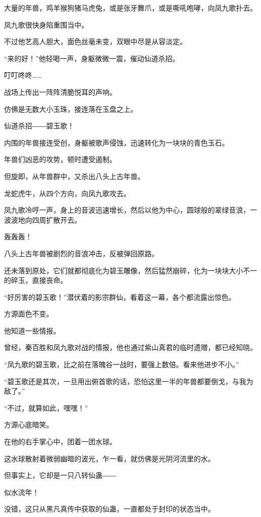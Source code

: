 
\begin{this_body}

大量的年兽，鸡羊猴狗猪马虎兔，或是张牙舞爪，或是嘶吼咆哮，向凤九歌扑去。

凤九歌很快身陷重围当中。

不过他艺高人胆大，面色丝毫未变，双眼中尽是从容淡定。

“来的好！”他轻喝一声，身躯微微一震，催动仙道杀招。

叮叮咚咚……

战场上传出一阵阵清脆悦耳的声响。

仿佛是无数大小玉珠，接连落在玉盘之上。

仙道杀招――碧玉歌！

内围的年兽接连受创，身躯被歌声侵蚀，迅速转化为一块块的青色玉石。

年兽们凶恶的攻势，顿时遭受遏制。

但旋即，从年兽群中，又杀出八头上古年兽。

龙蛇虎牛，从四个方向，向凤九歌攻去。

凤九歌冷哼一声，身上的音波迅速增长，然后以他为中心，圆球般的翠绿音浪，一波波地向四周扩散开去。

轰轰轰！

八头上古年兽被剧烈的音浪冲击，反被弹回原路。

还未落到原处，它们就都彻底化为碧玉雕像，然后猛然崩碎，化为一块块大小不一的碎玉，直接丧命。

“好厉害的碧玉歌！”潜伏着的影宗群仙，看着这一幕，各个都流露出惊色。

方源面色不变。

他知道一些情报。

曾经，秦百胜和凤九歌对战的情报，他也通过紫山真君的临时遗赠，都已经知晓。

“凤九歌的碧玉歌，比之前在落魄谷一战时，要强上数倍。看来他进步不小。”

“碧玉歌还是其次，一旦用出俯首歌的话，恐怕这里一半的年兽都要倒戈，与我为敌了。”

“不过，就算如此，嘿嘿！”

方源心底暗笑。

在他的右手掌心中，团着一团水球。

这水球散射着微弱幽暗的波光，乍一看，就仿佛是光阴河流里的水。

但事实上，它却是一只八转仙蛊――

似水流年！

没错，这只从黑凡真传中获取的仙蛊，一直都处于封印的状态当中。


\end{this_body}
